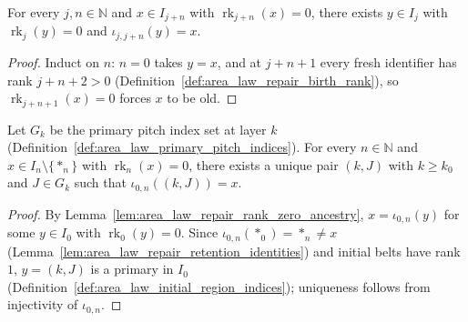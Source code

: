 \begin{lemma}
    \label{lem:area_law_repair_rank_zero_ancestry}
    \leanok
    For every $j,n\in\mathbb N$ and $x\in I_{j+n}$ with $\operatorname{rk}_{j+n}(x)=0$,
    there exists $y\in I_j$ with $\operatorname{rk}_j(y)=0$ and $\iota_{j,j+n}(y)=x$.
\end{lemma}

\begin{proof}
    \leanok
    Induct on $n$: $n=0$ takes $y=x$, and at $j+n+1$ every fresh identifier has
    rank $j+n+2>0$ (Definition~\ref{def:area_law_repair_birth_rank}), so $\operatorname{rk}_{j+n+1}(x)=0$
    forces $x$ to be old.
\end{proof}

\begin{lemma}
    \label{lem:area_law_repair_rank_zero_primary_ancestor}
    \leanok
    Let $G_k$ be the primary pitch index set at layer $k$
    (Definition~\ref{def:area_law_primary_pitch_indices}). For every $n\in\mathbb N$ and
    $x\in I_n\setminus\{*_n\}$ with $\operatorname{rk}_n(x)=0$, there exists a unique
    pair $(k,J)$ with $k\ge k_0$ and $J\in G_k$ such that $\iota_{0,n}((k,J))=x$.
\end{lemma}

\begin{proof}
    \leanok
    By Lemma~\ref{lem:area_law_repair_rank_zero_ancestry}, $x=\iota_{0,n}(y)$ for some $y\in I_0$
    with $\operatorname{rk}_0(y)=0$. Since $\iota_{0,n}(*_0)=*_n\ne x$
    (Lemma~\ref{lem:area_law_repair_retention_identities}) and initial belts have rank $1$,
    $y=(k,J)$ is a primary in $I_0$ (Definition~\ref{def:area_law_initial_region_indices});
    uniqueness follows from injectivity of $\iota_{0,n}$.
\end{proof}
